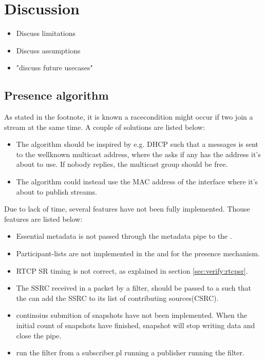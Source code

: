 \chapter{Discussion}\label{chp:discussion}
\begin{itemize}
	\item Discuss limitations
	\item Discuss assumptions
	\item "discuss future usecases"
\end{itemize}


\section{Presence algorithm}
As stated in the footnote, it is known a racecondition might occur if two \pubs{} join a stream at the same time. A couple of solutions are listed below:
\begin{itemize}
	\item The algorithm should be inspired by e.g. \ac{DHCP} such that a messages is sent to the wellknown multicast address, where the \pub{} asks if any has the address it's about to use. If nobody replies, the multicast group should be free.
	
	\item The algorithm could instead use the \ac{MAC} address of the interface where it's about to publish streams. 
\end{itemize}

Due to lack of time, several features have not been fully implemented.
Thouse features are listed below:
\begin{itemize}
	\item Essential metadata is not passed through the metadata pipe to the \con{}.
	\item Participant-lists are not implemented in the \sub{} and \pub{} for the presence mechanism.
	\item RTCP SR timing is not correct, as explained in section \ref{sec:verify:rtcpsr}.
	\item The SSRC received in a packet by a filter, should be passed to a  such that the \pub{} can add the SSRC to its list of contributing sources(CSRC).
	\item continoius submition of snapshots have not been implemented. When the initial count of snapshots have finished, snapshot will stop writing data and close the pipe.
	\item run the filter from a subscriber.pl running a publisher running the filter.
\end{itemize}

